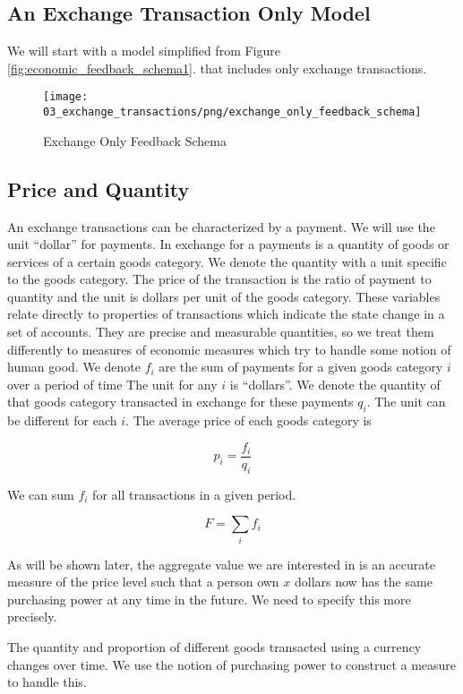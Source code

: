 \subsection{An Exchange Transaction Only Model}

We will start with a model simplified from Figure \ref{fig:economic_feedback_schema1}. that includes only
exchange transactions.

\begin{figure}[H]
\centering
\texttt{[image: 03\_exchange\_transactions/png/exchange\_only\_feedback\_schema]}
\caption{Exchange Only Feedback Schema}
\label{fig:exchange_only_feedback_schema1}
\end{figure}

\subsection{Price and Quantity}

An exchange transactions can be characterized by a payment. We will use the unit ``dollar''
for payments. In exchange for a payments is a quantity of goods or services of a certain goods
category. We denote the quantity with a unit specific to the goods category. The price of the
transaction is the ratio of payment to quantity and the unit is dollars per unit of the goods
category. These variables relate directly to properties of transactions which indicate the state
change in a set of accounts. They are precise and measurable quantities, so we treat them
differently to measures of economic measures which try to handle some notion of human good. We
denote $f_i$ are the sum of payments for a given goods category $i$ over a period of time The unit
for any $i$ is ``dollars''. We denote the quantity of that goods category transacted in
exchange for these payments $q_i$. The unit can be different for each $i$. The average price of each
goods category is 

\[
    p_i = \frac {f_i} {q_i}
\]

We can sum $f_i$ for all transactions in a given period.

\[
    F = \sum_i f_i
\]

As will be shown later, the aggregate value we are interested in is an accurate measure of the price
level such that a person own $x$ dollars now has the same purchasing power at any time in the
future. We need to specify this more precisely.

The quantity and proportion of different goods transacted using a currency changes over time. We use
the notion of purchasing power to construct a measure to handle this.

